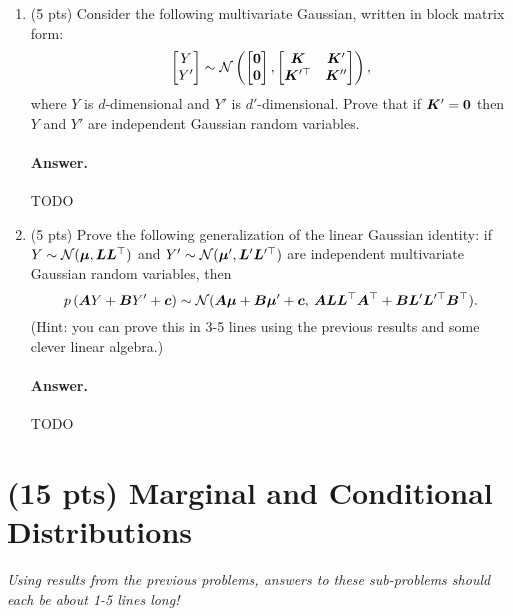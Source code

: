 \documentclass[11pt,letterpaper]{article}
\newenvironment{answer}{%
    \vspace{1em}
    \color{black}
    \paragraph{Answer.}
  }{%
    \vspace{1em}
  }
\begin{document}
\begin{enumerate}[resume]
  \item
    (5 pts)
    Consider the following multivariate Gaussian, written in block matrix form:
    \begin{equation*}
      \begin{bmatrix} Y \\ Y^\prime \end{bmatrix}
      \sim
      \mathcal{N} \left(
        \begin{bmatrix}
          {\bm{0}} \\ {\bm{0}}
        \end{bmatrix},
        \begin{bmatrix}
          {\bm{K}} & {\bm{K}}^\prime \\
          {\bm{K}}^{\prime\top} & {\bm{K}}^{\prime\prime}
        \end{bmatrix}
      \right),
    \end{equation*}
    where $Y$ is $d$-dimensional and $Y'$ is $d'$-dimensional.
    Prove that if ${\bm{K}}' = {\bm{0}}$ then $Y$ and $Y'$ are independent Gaussian random variables.

\begin{answer}
  TODO
\end{answer}

  \item (5 pts) Prove the following generalization of the linear Gaussian identity:
    if $Y \sim \mathcal{N}({\bm{\mu}}, {\bm{L}}{\bm{L}}^\top)$ and $Y' \sim \mathcal{N}({\bm{\mu}}', {\bm{L}}' {\bm{L}}^{\prime\top})$ are independent multivariate Gaussian random variables, then
    \begin{equation}
      p\left( {\bm{A}} Y + {\bm{B}} Y' + {\bm{c}} \right) \sim \mathcal{N}({\bm{A}} {\bm{\mu}} + {\bm{B}} {\bm{\mu}}' + {\bm{c}}, \: {\bm{A}} {\bm{L}}{\bm{L}}^\top {\bm{A}}^\top + {\bm{B}} {\bm{L}}'{\bm{L}}^{\prime\top} {\bm{B}}^\top).
      \label{eqn:affine_density}
    \end{equation}
    (Hint: you can prove this in 3-5 lines using the previous results and some clever linear algebra.)

\begin{answer}
  TODO
\end{answer}

\end{enumerate}



\section{(15 pts) Marginal and Conditional Distributions}
\emph{Using results from the previous problems, answers to these sub-problems should each be about 1-5 lines long!}
\end{document}
